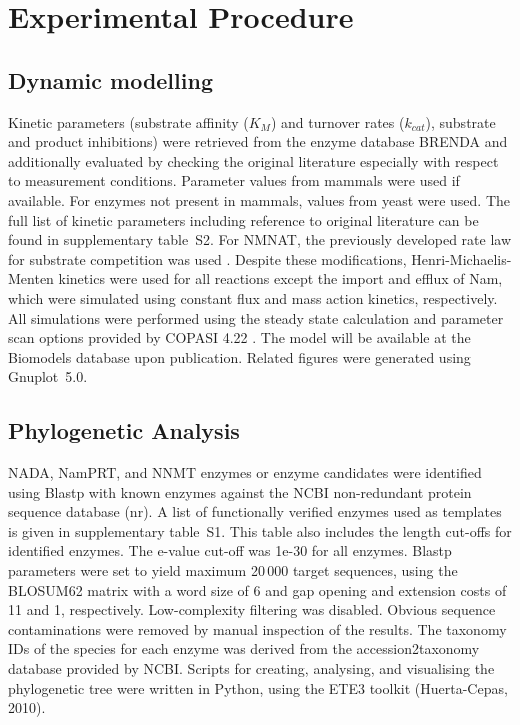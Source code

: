 
\section{Experimental Procedure}

\subsection{Dynamic modelling}

Kinetic parameters (substrate affinity ($K_{M}$) and turnover rates ($k_{cat}$), substrate and product inhibitions) were retrieved from the enzyme database BRENDA and additionally evaluated by checking the original literature especially with respect to measurement conditions. Parameter values from mammals were used if available. For enzymes not present in mammals, values from yeast were used. The full list of kinetic parameters including reference to original literature can be found in supplementary table~S2. For NMNAT, the previously developed rate law for substrate competition was used \cite{Schauble2013}. Despite these modifications, Henri-Michaelis-Menten kinetics were used for all reactions except the import and efflux of Nam, which were simulated using constant flux and mass action kinetics, respectively. All simulations were performed using the steady state calculation and parameter scan options provided by COPASI 4.22 \cite{Hoops2006}. The model will be available at the Biomodels database upon publication. Related figures were generated using Gnuplot~5.0.


\subsection{Phylogenetic Analysis}

NADA, NamPRT, and NNMT enzymes or enzyme candidates were identified using Blastp with known enzymes against the NCBI non-redundant protein sequence database (nr). A list of functionally verified enzymes used as templates is given in supplementary table~S1. This table also includes the length cut-offs for identified enzymes. The e-value cut-off was 1e-30 for all enzymes. Blastp parameters were set to yield maximum 20\,000 target sequences, using the BLOSUM62 matrix with a word size of 6 and gap opening and extension costs of 11 and 1, respectively. Low-complexity filtering was disabled. Obvious sequence contaminations were removed by manual inspection of the results. The taxonomy IDs of the species for each enzyme was derived from the accession2taxonomy database provided by NCBI. Scripts for creating, analysing, and visualising the phylogenetic tree were written in Python, using the ETE3 toolkit (Huerta-Cepas, 2010).


